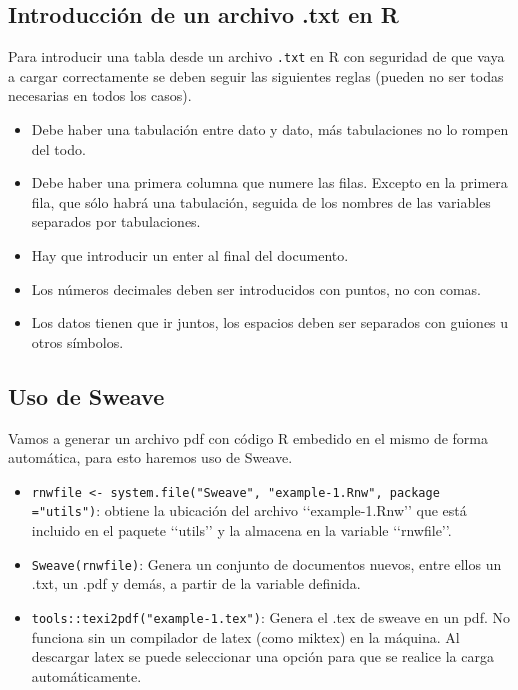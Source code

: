 \documentclass[a4paper, 12pt]{article}
\begin{document}
	\subsection{Introducción de un archivo .txt en R}
	Para introducir una tabla desde un archivo \texttt{.txt} en R con seguridad de que vaya a cargar correctamente se deben seguir las siguientes reglas (pueden no ser todas necesarias en todos los casos).
	
	\begin{itemize}
		\item Debe haber una tabulación entre dato y dato, más tabulaciones no lo rompen del todo.
		
		\item Debe haber una primera columna que numere las filas. Excepto en la primera fila, que sólo habrá una tabulación, seguida de los nombres de las variables separados por tabulaciones.
		
		\item Hay que introducir un enter al final del documento.
		
		\item Los números decimales deben ser introducidos con puntos, no con comas.
		
		\item Los datos tienen que ir juntos, los espacios deben ser separados con guiones u otros símbolos.
	\end{itemize}
	
	
	\subsection{Uso de Sweave}
	Vamos a generar un archivo pdf con código R embedido en el mismo de forma automática, para esto haremos uso de Sweave.
	
	\begin{itemize}
		\item \texttt{rnwfile <- system.file("Sweave", \string"example-1.Rnw", package =\string"utils")}: obtiene la ubicación del archivo ‘‘example-1.Rnw’’ que está incluido en el paquete ‘‘utils’’ y la almacena en la variable ‘‘rnwfile’’.
		
		\item \texttt{Sweave(rnwfile)}: Genera un conjunto de documentos nuevos, entre ellos un .txt, un .pdf y demás, a partir de la variable definida.
		
		\item \texttt{tools::texi2pdf(\string"example-1.tex")}: Genera el .tex de sweave en un pdf. No funciona sin un compilador de latex (como miktex) en la máquina. Al descargar latex se puede seleccionar una opción para que se realice la carga automáticamente.
	\end{itemize}
	
\end{document}
